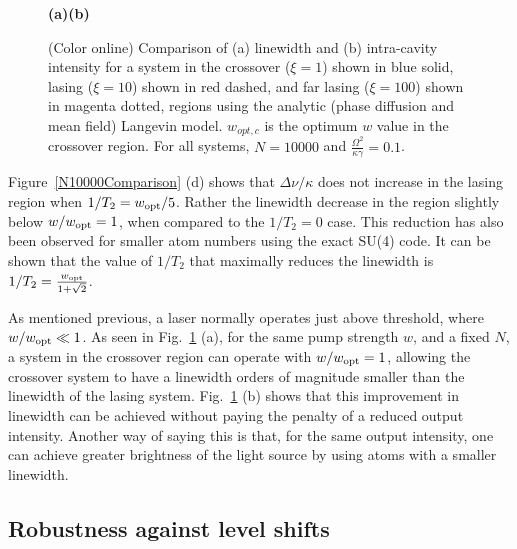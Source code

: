 \documentclass[aps,
twocolumn,
showpacs,
superscriptaddress,groupedaddress]{revtex4}
\begin{document}
\begin{figure}
\begin{center}
	\hspace{6mm}\textbf{(a)}\hspace{37mm}\textbf{(b)} \hspace{35mm}
\end{center}
		\vspace{-5mm}
\caption{(Color online) Comparison of (a) linewidth and (b) intra-cavity
intensity for a system in the crossover ($\xi=1$) shown in blue solid,
lasing ($\xi=10$) shown in red dashed, and far lasing ($\xi=100$) shown
in magenta dotted, regions using the analytic (phase diffusion and mean
field) Langevin model. $w_{opt,c}$ is the optimum $w$ value in the
crossover region. For all systems, $N=10000$ and $\frac{\Omega^2}{\kappa
\gamma}=0.1$.}
\label{LWadaComparison}
\end{figure}

Figure~\ref{N10000Comparison} (d) shows that $\Delta \nu/\kappa$ does
not increase in the lasing region when $1/T_2=w_{\rm opt}/5$.  Rather the
linewidth decrease in the region slightly below $w/w_{\rm opt}=1$, when
compared to the $1/T_2=0$ case. This reduction has also been observed
for smaller atom numbers using the exact SU(4) code. It can be shown
that the value of $1/T_2$ that maximally reduces the linewidth is
$1/T_2=\frac{w_{\rm opt}}{1+\sqrt{2}}$.

As mentioned previous, a laser normally operates just above threshold,
where $w/w_{\rm opt} \ll 1$. As seen in Fig.~\ref{LWadaComparison} (a), for
the same pump strength $w$, and a fixed $N$, a system in the crossover
region can operate with $w/w_{\rm opt} = 1$, allowing the crossover system
to have a linewidth orders of magnitude smaller than the linewidth of
the lasing system.  Fig.~\ref{LWadaComparison} (b) shows that this
improvement in linewidth can be achieved without paying the penalty of a
reduced output intensity.  Another way of saying this is that, for the
same output intensity, one can achieve greater brightness of the light
source by using atoms with a smaller linewidth.


\subsection{Robustness against level shifts}
\end{document}
